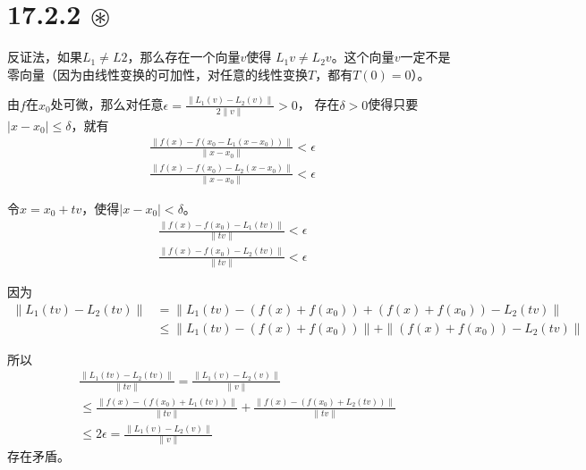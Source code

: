 \documentclass{article}
\begin{document}
\section*{17.2.2 $\circledast$} 

反证法，如果$L_1 \neq L2$，那么存在一个向量$v$使得
$L_1v \neq L_2v$。这个向量$v$一定不是零向量（因为由线性变换的可加性，对任意的线性变换$T$，都有$T(0) = 0$）。

由$f$在$x_0$处可微，那么对任意$\epsilon = \frac{\|L_1(v) - L_2(v)\|}{2\|v\|} > 0$，
存在$\delta > 0$使得只要$|x - x_0| \leq \delta$，就有
\begin{align*}
  \frac{\|f(x) - f(x_0 - L_1(x - x_0))\|}{\|x - x_0\|} < \epsilon \\
  \frac{\|f(x) - f(x_0) - L_2(x - x_0)\|}{\|x - x_0\|} < \epsilon
\end{align*}

令$x = x_0 + tv$，使得$|x - x_0| < \delta$。
\begin{align*}
  \frac{\|f(x) - f(x_0) - L_1(tv)\|}{\|tv\|} < \epsilon \\
  \frac{\|f(x) - f(x_0) - L_2(tv)\|}{\|tv\|} < \epsilon
\end{align*}

因为
\begin{align*}
  \|L_1(tv) - L_2(tv)\| & = \|L_1(tv) - (f(x) + f(x_0)) + (f(x) + f(x_0)) - L_2(tv)\|        \\
                        & \leq \|L_1(tv) - (f(x) + f(x_0))\| + \|(f(x) + f(x_0)) - L_2(tv)\|
\end{align*}

所以
\begin{align*}
   & \frac{\|L_1(tv) - L_2(tv)\|}{\|tv\|} = \frac{\|L_1(v) - L_2(v)\|}{\|v\|}                                                              \\
   & \leq \frac{\|f(x) - (f(x_0) + L_1(tv))\|}{\|tv\|} + \frac{\|f(x) - (f(x_0) + L_2(tv))\|}{\|tv\|} \\
   & \leq 2\epsilon = \frac{\|L_1(v) - L_2(v)\|}{\|v\|}
\end{align*}
存在矛盾。
\end{document}
